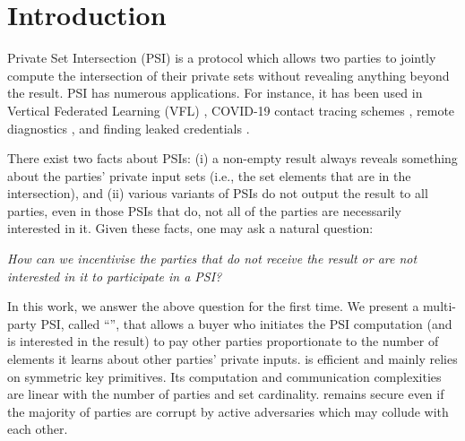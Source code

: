 





\section{Introduction}


Private Set Intersection (PSI) is a protocol which allows two parties to jointly compute the intersection of their private sets without revealing anything beyond the result. 
%
PSI has numerous applications. For instance, it has been used in Vertical Federated Learning (VFL) \cite{LuD20}, COVID-19 contact tracing schemes  \cite{DBLP:conf/asiacrypt/DuongPT20},  remote diagnostics \cite{BrickellPSW07}, and finding leaked credentials \cite{ThomasPYRKIBPPB19}. %



There exist two facts about PSIs: (i) a non-empty result always reveals something about the parties' private input sets (i.e., the set elements that are in the intersection), and (ii) various variants of PSIs do not output the result to all parties, even in those PSIs that do,  not all of the parties are necessarily interested in it.  Given these facts, one may ask a natural question:  

\vs

\begin{center}
\emph{How can we incentivise the parties that do not receive the result or are not interested in it to participate in a PSI?}
\end{center}

\vs


%
In this work, we answer the above question for the first time. We present a multi-party PSI, called ``\withRew'', that allows a buyer who initiates the PSI computation (and is interested in the result) to pay other parties proportionate to the number of elements it learns about other parties' private inputs.  \withRew is efficient and mainly relies on symmetric key primitives.  Its computation and communication complexities are linear with the number of parties and set cardinality. \withRew remains secure even if the majority of parties are corrupt by active adversaries which may collude with each other. 




